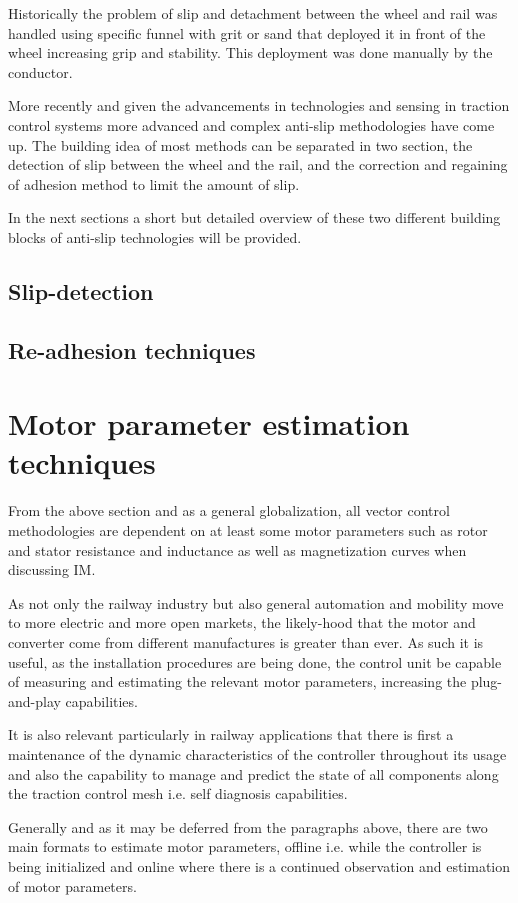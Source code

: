 Historically the problem of slip and detachment between the wheel and rail was handled using specific funnel with grit or sand that deployed it in front of the wheel increasing grip and stability. This deployment was done manually by the conductor. 

More recently and given the advancements in technologies and sensing in traction control systems more advanced and complex anti-slip methodologies have come up. The building idea of most methods can be separated in two section, the detection of  slip between the wheel and the rail, and the correction and regaining of adhesion method to limit the amount of slip.

In the next sections a short but detailed overview of these two different building blocks of anti-slip technologies will be provided.
\subsection{Slip-detection}
\subsection{Re-adhesion techniques}

\section{Motor parameter estimation techniques}
From the above section and as a general globalization, all vector control methodologies are dependent on at least some motor parameters such as rotor and stator resistance and inductance as well as magnetization curves when discussing IM.

As not only the railway industry but also general automation and mobility move to more electric and more open markets, the likely-hood that the motor and converter come from different manufactures is greater than ever. As such it is useful, as the installation procedures are being done, the control unit be capable of measuring and estimating the relevant motor parameters, increasing the plug-and-play capabilities.

It is also relevant particularly in railway applications that there is first a maintenance of the dynamic characteristics of the controller throughout its usage and also the capability to manage and predict the state of all components along the traction control mesh i.e. self diagnosis capabilities.

Generally and as it may be deferred from the paragraphs above, there are two main formats to estimate motor parameters, offline i.e. while the controller is being initialized and online where there is a continued observation and estimation of motor parameters. 

